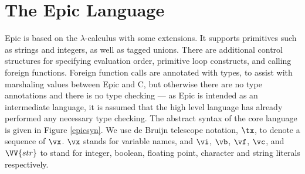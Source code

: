 \section{The Epic Language}

Epic is based on the $\lambda$-calculus with some extensions.
It supports primitives such as strings and integers, as well as tagged
unions. There are additional control structures for specifying
evaluation order, primitive loop constructs, and calling foreign
functions. Foreign function calls are annotated with types, to assist
with marshaling values between Epic and C, but otherwise there are no
type annotations and there is no type checking --- as Epic is intended
as an intermediate language, it is assumed that the high level
language has already performed any necessary type checking. The
abstract syntax of the core language is given in Figure \ref{epicsyn}.
We use de Bruijn telescope notation, $\tx$, to denote
a sequence of $\vx$. $\vx$ stands for variable names, and $\vi$, $\vb$, $\vf$,
$\vc$, and $\VV{str}$ to stand for integer, boolean, floating
point, character and string literals respectively.

\newcommand{\Con}[2]{\DC{Con}\:#1(#2)}

